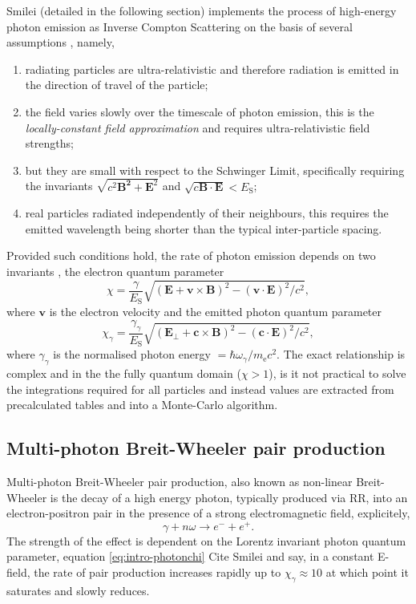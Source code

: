 Smilei (detailed in the following section) implements the process of high-energy photon emission as Inverse Compton Scattering on the basis of several assumptions \cite{nielQuantumClassicalModeling2018}, namely,
\begin{enumerate}
	\item radiating particles are ultra-relativistic and therefore radiation is emitted in the direction of travel of the particle;
	\item the field varies slowly over the timescale of photon emission, this is the \textit{locally-constant field approximation} and requires ultra-relativistic field strengths;
	\item but they are small with respect to the Schwinger Limit, specifically requiring the invariants $\sqrt{c^2\mathbf{B^2} + \mathbf{E}^2}$ and $\sqrt{c\mathbf{B}\cdot\mathbf{E}} < E_\mathrm{S}$;
	\item real particles radiated independently of their neighbours, this requires the emitted wavelength being shorter than the typical inter-particle spacing.
\end{enumerate}
Provided such conditions hold, the rate of photon emission depends on two invariants \cite{ritusQuantumEffectsInteraction1985}, the electron quantum parameter
\begin{equation}
	\chi = \frac{\gamma}{E_\mathrm{S}}\sqrt{(\mathbf{E} + \mathbf{v}\times\mathbf{B})^2- (\mathbf{v}\cdot\mathbf{E})^2/c^2},
\end{equation}
where $\mathbf{v}$ is the electron velocity and the emitted photon quantum parameter
\begin{equation}\label{eq:intro-photonchi}
	\chi_\gamma = \frac{\gamma_\gamma}{E_\mathrm{S}}\sqrt{(\mathbf{E}_\perp + \mathbf{c}\times\mathbf{B})^2- (\mathbf{c}\cdot\mathbf{E})^2/c^2},
\end{equation}
where $\gamma_\gamma$ is the normalised photon energy $=\hbar \omega_\gamma /m_\mathrm{e}c^2$. The exact relationship is complex and in the the fully quantum domain ($\chi > 1$), is it not practical to solve the integrations required for all particles and instead values are extracted from precalculated tables and into a Monte-Carlo algorithm. 

\subsection{Multi-photon Breit-Wheeler pair production}
Multi-photon Breit-Wheeler pair production, also known as non-linear Breit-Wheeler is the decay of a high energy photon, typically produced via \ac{RR}, into an electron-positron pair in the presence of a strong electromagnetic field, explicitely,
\begin{equation}
	\gamma + n\omega \to e^- + e^+.
\end{equation}
The strength of the effect is dependent on the Lorentz invariant photon quantum parameter, equation \ref{eq:intro-photonchi} Cite Smilei and say, in a constant E-field, the rate of pair production increases rapidly up to $\chi_\gamma \approx 10$ at which point it saturates and slowly reduces.

